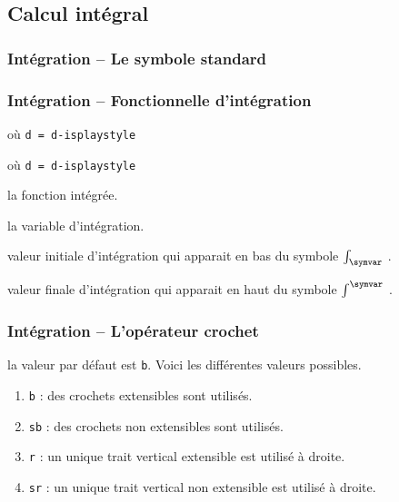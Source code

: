 \documentclass[12pt,a4paper]{article}
\theoremstyle{definition}
\newcommand\extraspace{
	\vspace{0.25em}
}
\newcommand\mwhyprefix[2]{%
	\texttt{#1 = #1-#2}%
}
\begin{document}
\subsection{Calcul intégral}

\subsubsection{Intégration -- Le symbole standard}






\subsubsection{Intégration -- Fonctionnelle d'intégration}



\extraspace

   où \quad \mwhyprefix{d}{isplaystyle}

  où \quad \mwhyprefix{d}{isplaystyle}


 la fonction intégrée.

 la variable d'intégration.

 valeur initiale d'intégration qui apparait en bas du symbole $\int_{\symvar}$ .

 valeur finale d'intégration qui apparait en haut du symbole $\int^{\symvar}$ .






\subsubsection{Intégration -- L'opérateur crochet}




\IDoption{} la valeur par défaut est \verb+b+. Voici les différentes valeurs possibles.
\begin{enumerate}
	\item \verb+b+ : des crochets extensibles sont utilisés.

	\item \verb+sb+ : des crochets non extensibles sont utilisés.

	\item \verb+r+ : un unique trait vertical extensible est utilisé à droite.

	\item \verb+sr+ : un unique trait vertical non extensible est utilisé à droite.
\end{enumerate}
\end{document}
